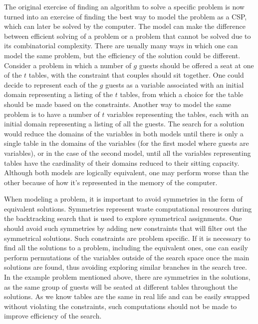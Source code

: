 \documentclass{l4proj}
\begin{document}
\noindent The original exercise of finding an algorithm to solve a specific problem is now turned into an exercise of finding the best way to model the problem as a CSP, which can later be solved by the computer. The model can make the difference between efficient solving of a problem or a problem that cannot be solved due to its combinatorial complexity. There are usually many ways in which one can model the same problem, but the efficiency of the solution could be different. Consider a problem in which a number of $g$ guests should be offered a seat at one of the $t$ tables, with the constraint that couples should sit together. One could decide to represent each of the $g$ guests as a variable associated with an initial domain representing a listing of the $t$ tables, from which a choice for the table should be made based on the constraints. Another way to model the same problem is to have a number of $t$ variables representing the tables, each with an initial domain representing a listing of all the guests. The search for a solution would reduce the domains of the variables in both models until there is only a single table in the domains of the variables (for the first model where guests are variables), or in the case of the second model, until all the variables representing tables have the cardinality of their domains reduced to their sitting capacity. Although both models are logically equivalent, one may perform worse than the other because of how it’s represented in the memory of the computer.

\noindent When modeling a problem, it is important to avoid symmetries in the form of equivalent solutions. Symmetries represent waste computational resources during the backtracking search that is used to explore symmetrical assignments. One should avoid such symmetries by adding new constraints that will filter out the symmetrical solutions. Such constraints are problem specific. If it is necessary to find all the solutions to a problem, including the equivalent ones, one can easily perform permutations of the variables outside of the search space once the main solutions are found, thus avoiding exploring similar branches in the search tree. In the example problem mentioned above, there are symmetries in the solutions, as the same group of guests will be seated at different tables throughout the solutions. As we know tables are the same in real life and can be easily swapped without violating the constraints, such computations should not be made to improve efficiency of the search.
\end{document}
